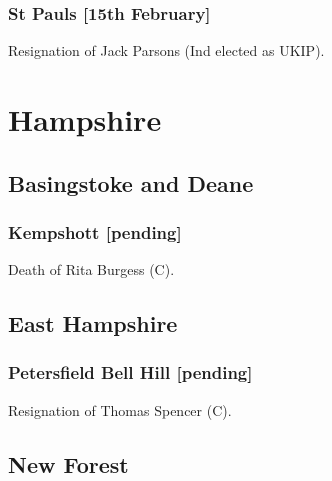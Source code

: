 \documentclass[a4paper,openany]{book}
\begin{document}
\begin{resultsiii}
\subsubsection*{St Pauls \hspace*{\fill}\nolinebreak[1]%
\enspace\hspace*{\fill}
[15th February]}


Resignation of Jack Parsons (Ind elected as UKIP).

\section{Hampshire}

\subsection*{Basingstoke and Deane}

\subsubsection*{Kempshott \hspace*{\fill}\nolinebreak[1]%
\enspace\hspace*{\fill}
[pending]}


Death of Rita Burgess (C).

\subsection*{East Hampshire}

\subsubsection*{Petersfield Bell Hill \hspace*{\fill}\nolinebreak[1]%
\enspace\hspace*{\fill}
[pending]}


Resignation of Thomas Spencer (C).

\subsection*{New Forest}


\end{resultsiii}
\end{document}
